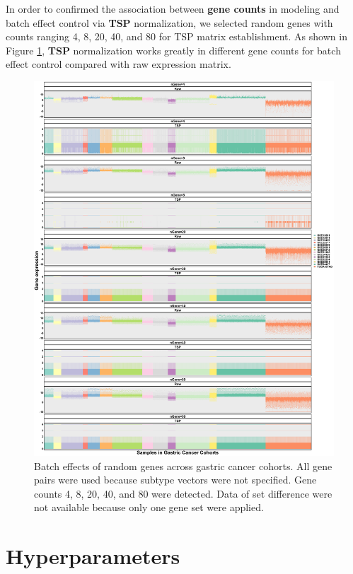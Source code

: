 \documentclass[
  12pt,
]{book}
\begin{document}
In order to confirmed the association between \textbf{gene counts} in modeling and batch effect control via \textbf{TSP} normalization, we selected random genes with counts ranging 4, 8, 20, 40, and 80 for TSP matrix establishment. As shown in Figure \ref{fig:be02}, \textbf{TSP} normalization works greatly in different gene counts for batch effect control compared with raw expression matrix.

\begin{figure}

{\centering \includegraphics[width=0.9\linewidth]{./fig/bactch-effect-02} 

}

\caption{Batch effects of random genes across gastric cancer cohorts.  All gene pairs were used because subtype vectors were not specified. Gene counts 4, 8, 20, 40, and 80 were detected. Data of set difference were not available because only one gene set were applied.}\label{fig:be02}
\end{figure}

\hypertarget{hyperparameters}{%
\section{Hyperparameters}\label{hyperparameters}}
\end{document}
